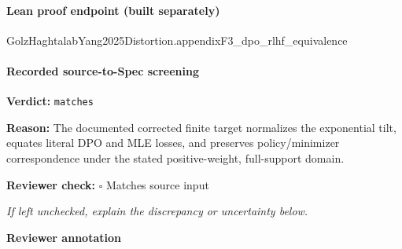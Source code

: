 \documentclass[10pt]{article}
\newcommand{\reviewerbox}{%
  \par\noindent\fbox{\parbox{0.96\linewidth}{\rule{0pt}{0.38in}}}\par
}
\newcommand{\reviewmatch}[1]{%
  \par\noindent\textbf{Reviewer check:} $\square$\; #1\par
  \noindent\emph{If left unchecked, explain the discrepancy or uncertainty below.}\par
}
\begin{document}
\paragraph{Lean proof endpoint (built separately)}\begin{ReviewVerbatim}
GolzHaghtalabYang2025Distortion.appendixF3_dpo_rlhf_equivalence
\end{ReviewVerbatim}

\paragraph{Recorded source-to-Spec screening}
\textbf{Verdict:} \texttt{matches}
\\
{\raggedright
\textbf{Reason:} The documented corrected finite target normalizes the exponential tilt, equates literal DPO and MLE losses, and preserves policy/\allowbreak{}minimizer correspondence under the stated positive-\allowbreak{}weight, full-\allowbreak{}support domain.\allowbreak{}
\par}
\reviewmatch{Matches source input}
\noindent\textbf{Reviewer annotation}\par
\reviewerbox
\end{document}
